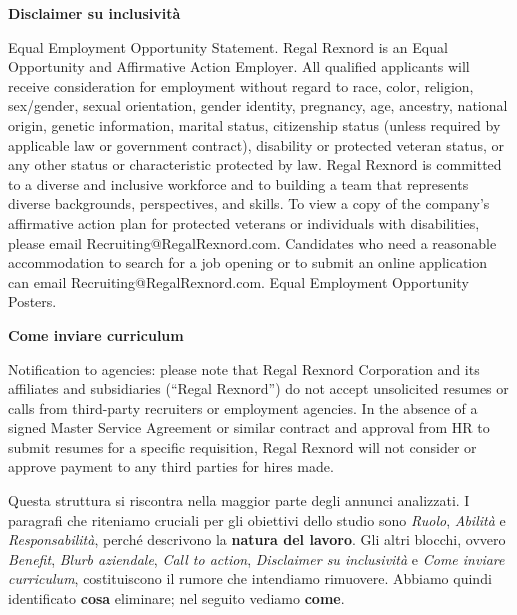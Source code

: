 \noindent\textbf{\textcolor{inclusivityColor}{Disclaimer su inclusività}}\par
\noindent Equal Employment Opportunity Statement. Regal Rexnord is an Equal Opportunity and Affirmative Action Employer. All qualified applicants will receive consideration for employment without regard to race, color, religion, sex/gender, sexual orientation, gender identity, pregnancy, age, ancestry, national origin, genetic information, marital status, citizenship status (unless required by applicable law or government contract), disability or protected veteran status, or any other status or characteristic protected by law. Regal Rexnord is committed to a diverse and inclusive workforce and to building a team that represents diverse backgrounds, perspectives, and skills. To view a copy of the company's affirmative action plan for protected veterans or individuals with disabilities, please email Recruiting@RegalRexnord.com. Candidates who need a reasonable accommodation to search for a job opening or to submit an online application can email Recruiting@RegalRexnord.com. Equal Employment Opportunity Posters.\par
\noindent{\color{inclusivityColor}\rule{\textwidth}{0.6pt}}\par\medskip

\noindent\textbf{\textcolor{applicationColor}{Come inviare curriculum}}\par
\noindent Notification to agencies: please note that Regal Rexnord Corporation and its affiliates and subsidiaries (``Regal Rexnord'') do not accept unsolicited resumes or calls from third-party recruiters or employment agencies. In the absence of a signed Master Service Agreement or similar contract and approval from HR to submit resumes for a specific requisition, Regal Rexnord will not consider or approve payment to any third parties for hires made.\par
\noindent{\color{applicationColor}\rule{\textwidth}{0.6pt}}\par\medskip

Questa struttura si riscontra nella maggior parte degli annunci analizzati. I paragrafi che riteniamo cruciali per gli obiettivi dello studio sono \textit{Ruolo}, \textit{Abilità} e \textit{Responsabilità}, perché descrivono la \textbf{natura del lavoro}. Gli altri blocchi, ovvero \textit{Benefit}, \textit{Blurb aziendale}, \textit{Call to action}, \textit{Disclaimer su inclusività} e \textit{Come inviare curriculum}, costituiscono il rumore che intendiamo rimuovere. Abbiamo quindi identificato \textbf{cosa} eliminare; nel seguito vediamo \textbf{come}.

